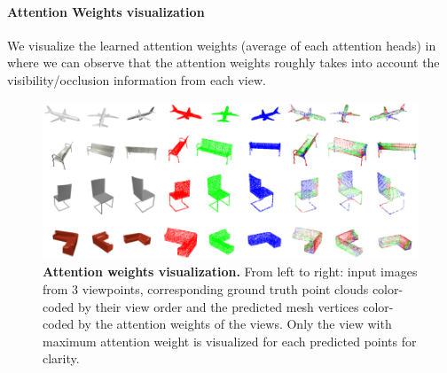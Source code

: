 \paragraph{Attention Weights visualization}
We visualize the learned attention weights (average of each attention heads) in~ where we can observe that the attention weights roughly takes into account the visibility/occlusion information from each view.
\begin{figure}[t]
\begin{center}
\includegraphics[width=\linewidth]{imgs/attention_weights_visualization.png}
\end{center}
    \caption{
        \textbf{Attention weights visualization.}
        From left to right: input images from 3 viewpoints, corresponding ground truth point clouds color-coded by their view order and the predicted mesh vertices color-coded by the attention weights of the views.
        Only the view with maximum attention weight is visualized for each predicted points for clarity.
    }
\label{fig:attention_weights}
\end{figure}

